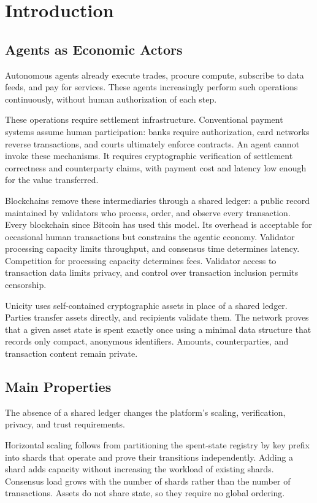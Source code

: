 \section*{Introduction}

\subsection*{Agents as Economic Actors}

Autonomous agents already execute trades, procure compute, subscribe to data feeds, and pay for services. These agents increasingly perform such operations continuously, without human authorization of each step.

These operations require settlement infrastructure. Conventional payment systems assume human participation: banks require authorization, card networks reverse transactions, and courts ultimately enforce contracts. An agent cannot invoke these mechanisms. It requires cryptographic verification of settlement correctness and counterparty claims, with payment cost and latency low enough for the value transferred.

Blockchains remove these intermediaries through a shared ledger: a public record maintained by validators who process, order, and observe every transaction. Every blockchain since Bitcoin has used this model. Its overhead is acceptable for occasional human transactions but constrains the agentic economy. Validator processing capacity limits throughput, and consensus time determines latency. Competition for processing capacity determines fees. Validator access to transaction data limits privacy, and control over transaction inclusion permits censorship.

Unicity uses self-contained cryptographic assets in place of a shared ledger. Parties transfer assets directly, and recipients validate them. The network proves that a given asset state is spent exactly once using a minimal data structure that records only compact, anonymous identifiers. Amounts, counterparties, and transaction content remain private.

\subsection*{Main Properties}

The absence of a shared ledger changes the platform's scaling, verification, privacy, and trust requirements.

Horizontal scaling follows from partitioning the spent-state registry by key prefix into shards that operate and prove their transitions independently. Adding a shard adds capacity without increasing the workload of existing shards. Consensus load grows with the number of shards rather than the number of transactions. Assets do not share state, so they require no global ordering.

